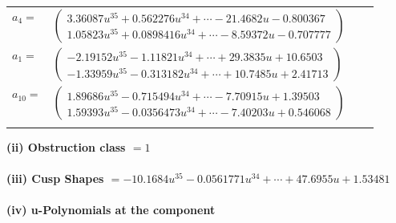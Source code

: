 \documentclass[1p]{elsarticle_modified}
\theoremstyle{definition}
\begin{document}
\begin{tabular}{m{7pt} m{180pt} m{7pt} m{180pt} }
\flushright $a_{4}=$&$\begin{pmatrix}3.36087 u^{35}+0.562276 u^{34}+\cdots-21.4682 u-0.800367\\1.05823 u^{35}+0.0898416 u^{34}+\cdots-8.59372 u-0.707777\end{pmatrix}$ \\
\flushright $a_{1}=$&$\begin{pmatrix}-2.19152 u^{35}-1.11821 u^{34}+\cdots+29.3835 u+10.6503\\-1.33959 u^{35}-0.313182 u^{34}+\cdots+10.7485 u+2.41713\end{pmatrix}$ \\
\flushright $a_{10}=$&$\begin{pmatrix}1.89686 u^{35}-0.715494 u^{34}+\cdots-7.70915 u+1.39503\\1.59393 u^{35}-0.0356473 u^{34}+\cdots-7.40203 u+0.546068\end{pmatrix}$\\&\end{tabular}
\flushleft \textbf{(ii) Obstruction class $= 1$}\\~\\
\flushleft \textbf{(iii) Cusp Shapes $= -10.1684 u^{35}-0.0561771 u^{34}+\cdots+47.6955 u+1.53481$}\\~\\
\newpage\renewcommand{\arraystretch}{1}
\flushleft \textbf{(iv) u-Polynomials at the component}\newline \\
\end{document}
